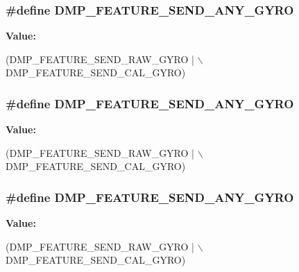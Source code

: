 \subsubsection[{\texorpdfstring{D\+M\+P\+\_\+\+F\+E\+A\+T\+U\+R\+E\+\_\+\+S\+E\+N\+D\+\_\+\+A\+N\+Y\+\_\+\+G\+Y\+RO}{DMP_FEATURE_SEND_ANY_GYRO}}]{\setlength{\rightskip}{0pt plus 5cm}\#define D\+M\+P\+\_\+\+F\+E\+A\+T\+U\+R\+E\+\_\+\+S\+E\+N\+D\+\_\+\+A\+N\+Y\+\_\+\+G\+Y\+RO}\hypertarget{group___d_r_i_v_e_r_s_gadda8f4118bd084cfb4fcda3571585c56}{}\label{group___d_r_i_v_e_r_s_gadda8f4118bd084cfb4fcda3571585c56}
{\bfseries Value\+:}
\begin{DoxyCode}
(DMP\_FEATURE\_SEND\_RAW\_GYRO | \(\backslash\)
                                     DMP\_FEATURE\_SEND\_CAL\_GYRO)
\end{DoxyCode}
\subsubsection[{\texorpdfstring{D\+M\+P\+\_\+\+F\+E\+A\+T\+U\+R\+E\+\_\+\+S\+E\+N\+D\+\_\+\+A\+N\+Y\+\_\+\+G\+Y\+RO}{DMP_FEATURE_SEND_ANY_GYRO}}]{\setlength{\rightskip}{0pt plus 5cm}\#define D\+M\+P\+\_\+\+F\+E\+A\+T\+U\+R\+E\+\_\+\+S\+E\+N\+D\+\_\+\+A\+N\+Y\+\_\+\+G\+Y\+RO}\hypertarget{group___d_r_i_v_e_r_s_gadda8f4118bd084cfb4fcda3571585c56}{}\label{group___d_r_i_v_e_r_s_gadda8f4118bd084cfb4fcda3571585c56}
{\bfseries Value\+:}
\begin{DoxyCode}
(DMP\_FEATURE\_SEND\_RAW\_GYRO | \(\backslash\)
                                     DMP\_FEATURE\_SEND\_CAL\_GYRO)
\end{DoxyCode}
\subsubsection[{\texorpdfstring{D\+M\+P\+\_\+\+F\+E\+A\+T\+U\+R\+E\+\_\+\+S\+E\+N\+D\+\_\+\+A\+N\+Y\+\_\+\+G\+Y\+RO}{DMP_FEATURE_SEND_ANY_GYRO}}]{\setlength{\rightskip}{0pt plus 5cm}\#define D\+M\+P\+\_\+\+F\+E\+A\+T\+U\+R\+E\+\_\+\+S\+E\+N\+D\+\_\+\+A\+N\+Y\+\_\+\+G\+Y\+RO}\hypertarget{group___d_r_i_v_e_r_s_gadda8f4118bd084cfb4fcda3571585c56}{}\label{group___d_r_i_v_e_r_s_gadda8f4118bd084cfb4fcda3571585c56}
{\bfseries Value\+:}
\begin{DoxyCode}
(DMP\_FEATURE\_SEND\_RAW\_GYRO | \(\backslash\)
                                     DMP\_FEATURE\_SEND\_CAL\_GYRO)
\end{DoxyCode}


